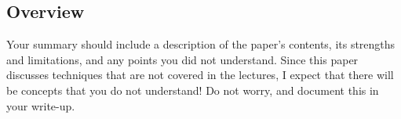 \documentclass[
10pt, %
a4paper, %
oneside, %
headinclude,footinclude, %
BCOR5mm, %
]{scrartcl}
\title{\normalfont\spacedallcaps{Reading Assignment 4}} %
\subtitle{Critical Summary: Chain of Thought Reasoning} %
\author{\spacedlowsmallcaps{Caleb Moses*}} %
\date{} %
\renewcommand{\thesubsection}{\arabic{subsection}}
\begin{document}

\renewcommand{\sectionmark}[1]{\markright{\spacedlowsmallcaps{#1}}} %
\lehead{\mbox{\llap{\small\thepage\kern1em\color{halfgray} \vline}\color{halfgray}\hspace{0.5em}\rightmark\hfil}} %

\pagestyle{scrheadings} %


\maketitle %
\vspace{-20mm} %

\setcounter{tocdepth}{2} %


\let\thefootnote\relax{}




\subsection{Overview}
Your summary should include a description of the paper's contents, its strengths and limitations, and any points you did not understand. Since this paper discusses techniques that are not covered in the lectures, I expect that there will be concepts that you do not understand! Do not worry, and document this in your write-up.
\end{document}
